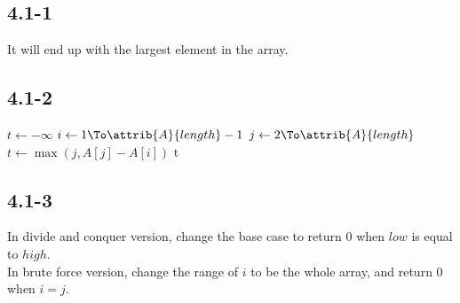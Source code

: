 \subsection{4.1-1}
    It will end up with the largest element in the array.

\subsection{4.1-2}
    \begin{codebox}
        \li $t \gets -\infty$
        \li \For $i \gets 1 \To \attrib{A}{length}-1$
            \Do
        \li     \For $j \gets 2 \To \attrib{A}{length}$
                \Do
        \li         $t \gets \max(j, A[j] - A[i])$
                \End
        \li \Return t
            \End
    \end{codebox}

\subsection{4.1-3}
    In divide and conquer version, change the base case to return 0 when $low$
    is equal to $high$. \\
    In brute force version, change the range of $i$ to be the whole array, and
    return 0 when $i = j$.

